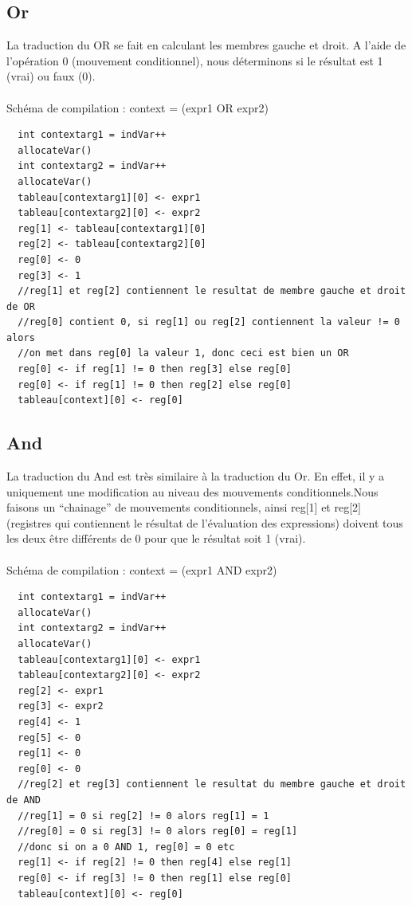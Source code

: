 \documentclass[a4paper,12pt]{report}
\begin{document}
\subsection{Or}
La traduction du OR se fait en calculant les membres gauche et droit.
A l'aide de l'opération 0 (mouvement conditionnel), nous déterminons si le résultat est 1 (vrai) ou faux (0).
\\ \\
Schéma de compilation : context = (expr1 OR expr2)
\begin{verbatim}
  int contextarg1 = indVar++
  allocateVar()
  int contextarg2 = indVar++
  allocateVar()
  tableau[contextarg1][0] <- expr1
  tableau[contextarg2][0] <- expr2
  reg[1] <- tableau[contextarg1][0]
  reg[2] <- tableau[contextarg2][0]
  reg[0] <- 0
  reg[3] <- 1
  //reg[1] et reg[2] contiennent le resultat de membre gauche et droit de OR
  //reg[0] contient 0, si reg[1] ou reg[2] contiennent la valeur != 0 alors
  //on met dans reg[0] la valeur 1, donc ceci est bien un OR
  reg[0] <- if reg[1] != 0 then reg[3] else reg[0]
  reg[0] <- if reg[1] != 0 then reg[2] else reg[0]
  tableau[context][0] <- reg[0]
\end{verbatim}

\subsection{And}
La traduction du And est très similaire à la traduction du Or. En effet, il y a uniquement une modification au niveau des mouvements
conditionnels.Nous faisons un ``chainage'' de mouvements conditionnels, ainsi reg[1] et reg[2] (registres qui contiennent le
résultat de l'évaluation des expressions) doivent tous les deux être différents de 0 pour que le résultat soit 1 (vrai).
\\ \\
Schéma de compilation : context = (expr1 AND expr2)
\begin{verbatim}
  int contextarg1 = indVar++
  allocateVar()
  int contextarg2 = indVar++
  allocateVar()
  tableau[contextarg1][0] <- expr1
  tableau[contextarg2][0] <- expr2
  reg[2] <- expr1
  reg[3] <- expr2
  reg[4] <- 1
  reg[5] <- 0
  reg[1] <- 0
  reg[0] <- 0
  //reg[2] et reg[3] contiennent le resultat du membre gauche et droit de AND
  //reg[1] = 0 si reg[2] != 0 alors reg[1] = 1
  //reg[0] = 0 si reg[3] != 0 alors reg[0] = reg[1]
  //donc si on a 0 AND 1, reg[0] = 0 etc
  reg[1] <- if reg[2] != 0 then reg[4] else reg[1]
  reg[0] <- if reg[3] != 0 then reg[1] else reg[0]
  tableau[context][0] <- reg[0]
\end{verbatim}
\end{document}

